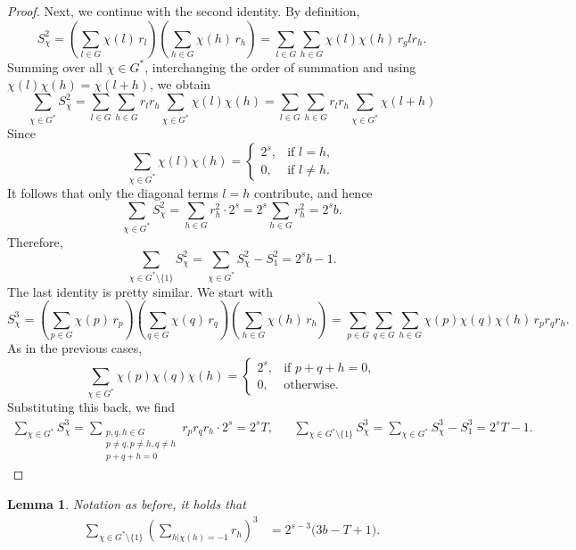 \documentclass[12pt,twoside,]{amsart}
\theoremstyle{plain}
\newtheorem{lemma}[theorem]{Lemma}
\theoremstyle{definition}
\begin{document}
\begin{proof}
Next, we continue with the second identity.
By definition,
\[
S_{\chi}^2
= \left( \sum_{l \in G} \chi(l)\, r_l \right)
  \left( \sum_{h \in G } \chi(h)\, r_h \right)
= \sum_{l \in G } \sum_{h \in G }
    \chi(l)\chi(h)\, r_glr_h.
\]
Summing over all $\chi \in G^{\ast}$, interchanging the order of summation and using $\chi(l)\chi(h) = \chi(l+h)$, we obtain
\[
\sum_{\chi \in G^{\ast}} S_{\chi}^2
= \sum_{l \in G } \sum_{h \in G }
    r_l r_h \sum_{\chi \in G^{\ast}} \chi(l)\chi(h)
=
\sum_{l \in G } \sum_{h \in G}
    r_l r_h \sum_{\chi \in G^{\ast}} \chi(l + h)
\]
Since
\[
\sum_{\chi \in G^{\ast}} \chi(l)\chi(h)
=
\begin{cases}
2^s, & \text{if } l = h,\\
0, & \text{if } l \neq h.
\end{cases}
\]
It follows that only the diagonal terms $l=h$ contribute, and hence
\[
\sum_{\chi \in G^{\ast}} S_{\chi}^2
= \sum_{h \in G} r_h^2 \cdot 2^s
= 2^s \sum_{h \in G } r_h^2
= 2^s b.
\]
Therefore,
\[
\sum_{\chi \in G^{\ast} \setminus \{1\}} S_{\chi}^2
= \sum_{\chi \in G^{\ast}} S_{\chi}^2 - S_1^2
= 2^s b - 1.
\]
The last identity is pretty similar. We start with
\[
S_{\chi}^3
= \left( \sum_{p \in G } \chi(p)\, r_p \right)
  \left( \sum_{q \in G } \chi(q)\, r_q \right)
  \left( \sum_{h \in G } \chi(h)\, r_h \right)
= \sum_{p \in G }
  \sum_{q \in G }
  \sum_{h \in G }
  \chi(p)\chi(q)\chi(h)\, r_p r_q r_h.
\]
As in the previous cases,
\[
\sum_{\chi \in G^{\ast}} \chi(p)\chi(q)\chi(h)
=
\begin{cases}
2^s, & \text{if } p+q+h = 0,\\[4pt]
0, & \text{otherwise}.
\end{cases}
\]
Substituting this back, we find
\begin{align*}
\sum_{\chi \in G^{\ast}} S_{\chi}^3
= \sum_{\substack{p,q,h \in G  \\ 
p \neq q, p \neq h, q \neq h
\\
p+q+h = 0}}
   r_p r_q r_h \cdot 2^s
= 2^s T,
&&
\sum_{\chi \in G^{\ast} \setminus \{1\}} S_{\chi}^3
= \sum_{\chi \in G^{\ast}} S_{\chi}^3 - S_1^3
= 2^s T - 1.
\end{align*}
\end{proof}
\begin{lemma}\label{lemma:cubic_rg}
Notation as before, it holds that
\begin{align}
\sum_{\chi \in G^{\ast} \setminus \{1\}} 
\left(
\sum_{h | \chi(h)=-1}r_h
\right)^3
 &= 2^{s-3}\bigl( 3b - T + 1 \bigr).
\end{align}
\end{lemma}
\end{document}
